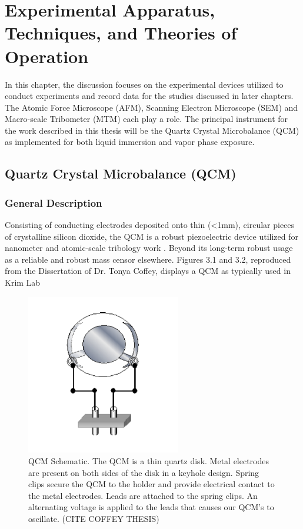 \chapter{Experimental Apparatus, Techniques, and Theories of Operation}

\label{chap-two}

In this chapter, the discussion focuses on the experimental devices utilized to conduct experiments and record data for the studies discussed in later chapters. The Atomic Force Microscope (AFM), Scanning Electron Microscope (SEM) and Macro-scale Tribometer (MTM) each play a role. The principal instrument for the work described in this thesis will be the Quartz Crystal Microbalance (QCM) as implemented for both liquid immersion and vapor phase exposure.

\section{Quartz Crystal Microbalance (QCM)}

\subsection{General Description}

 Consisting of conducting electrodes deposited onto thin (<1mm), circular pieces of crystalline silicon dioxide, the QCM is a robust piezoelectric device utilized for nanometer and atomic-scale tribology work \cite{21,22}. Beyond its long-term robust usage as a reliable and robust mass censor elsewhere. Figures 3.1 and 3.2, reproduced from the Dissertation of Dr. Tonya Coffey, displays a QCM as typically used in Krim Lab

\begin{figure}[hbtp]
	\centering
	\includegraphics[width=0.6\textwidth]{Chapter-2/fig1_QCM}
	\caption{QCM Schematic. The QCM is a thin quartz disk. Metal electrodes are	present on both sides of the disk in a keyhole design. Spring clips secure the QCM to the holder and provide electrical contact to the metal electrodes. Leads are attached to	the spring clips. An alternating voltage is applied to the leads that causes our QCM’s	to oscillate. (CITE COFFEY THESIS)}
	\label{fig1:QCM fig 1}
\end{figure}

